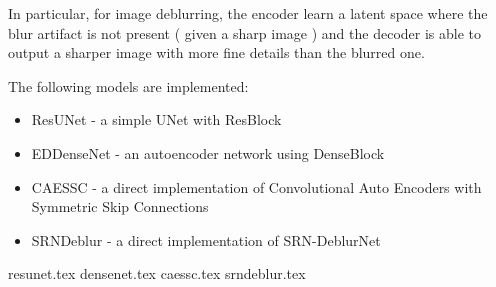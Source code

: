 \documentclass{article}
\begin{document}
In particular, for image deblurring, the encoder learn a latent space where the blur artifact is not present ( given a sharp image ) and the decoder is able to output a sharper image with more fine details than the blurred one.

The following models are implemented:
\begin{itemize}
    \item ResUNet - a simple UNet with ResBlock \cite{resnet}
    \item EDDenseNet - an autoencoder network using DenseBlock\cite{densenet}
    \item CAESSC - a direct implementation of Convolutional Auto Encoders with Symmetric Skip Connections\cite{CAESSC}    
    \item SRNDeblur - a direct implementation of SRN-DeblurNet\cite{SRN-DeblurNet}
\end{itemize}

\clearpage
{resunet.tex}
\clearpage
{densenet.tex}
\clearpage
{caessc.tex}
\clearpage
{srndeblur.tex}

\clearpage


\end{document}

